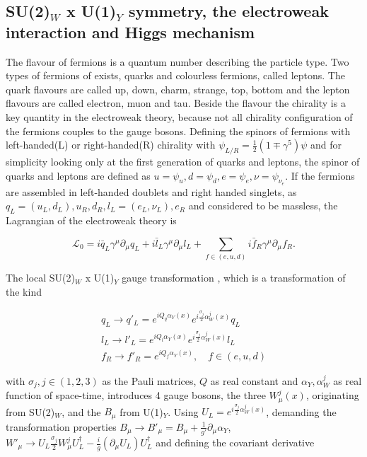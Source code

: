 \subsection{SU(2)$_{W}$ x U(1)$_{Y}$ symmetry, the electroweak interaction and Higgs mechanism}
\label{sec:section_1_1_3}

The flavour of fermions is a quantum number describing the particle type. Two types of fermions of exists, quarks and colourless fermions, called leptons. The quark flavours are called up, down, charm, strange, top, bottom and the lepton flavours are called electron, muon and tau. Beside the flavour the chirality is a key quantity in the electroweak theory, because not all chirality configuration of the fermions couples to the gauge bosons. Defining the spinors of fermions with left-handed(L) or right-handed(R) chirality with $\psi_{L/R} = \frac{1}{2}(1\mp \gamma^{5})\psi$ and for simplicity looking only at the first generation of quarks and leptons, the spinor of quarks and leptons are defined as $u = \psi_{u}, d = \psi_{d}, e = \psi_{e}, \nu = \psi_{\nu_{e}}$. If the fermions are assembled in left-handed doublets and right handed singlets, as $q_{L} = (u_{L}, d_{L}), u_{R}, d_{R}, l_{L} = (e_{L}, \nu_{L}), e_{R}$ and considered to be massless, the Lagrangian of the electroweak theory is

\begin{equation}
	\label{eq:eq_1_5}
	\mathcal{L}_{0} = i\bar{q}_{L}\gamma^{\mu}\partial_{\mu}q_{L} + i\bar{l}_{L}\gamma^{\mu}\partial_{\mu}l_{L} + \sum_{f \in (e, u, d)} i\bar{f}_{R}\gamma^{\mu}\partial_{\mu}f_{R}.
\end{equation}

The local SU(2)$_{W}$ x U(1)$_{Y}$ gauge transformation \cite{EWK}, which is a transformation of the kind

\begin{equation}
	\label{eq:eq_1_6}
	\begin{split}
		q_{L} \rightarrow q'_{L} = e^{iQ_{q} \alpha_{Y}(x)} e^{i\frac{\sigma_{j}}{2}\alpha^{j}_{W}(x)}q_{L} \\
		l_{L} \rightarrow l'_{L} = e^{iQ_{l} \alpha_{Y}(x)} e^{i\frac{\sigma_{j}}{2}\alpha^{j}_{W}(x)}l_{L} \\
		f_{R} \rightarrow f'_{R} = e^{iQ_{f} \alpha_{Y}(x)}, \quad f \in (e, u, d)
	\end{split}			
\end{equation}

with $\sigma_{j}, j \in (1,2,3)$ as the Pauli matrices, $Q$ as real constant and $\alpha_{Y}, \alpha^{j}_{W}$ as real function of space-time, introduces 4 gauge bosons, the three $W^{j}_{\mu}(x)$, originating from SU(2)$_{W}$, and the $B_{\mu}$ from U(1)$_{Y}$. Using $U_{L} = e^{i\frac{\sigma_{j}}{2}\alpha^{j}_{W}(x)}$, demanding the transformation properties $B_{\mu} \rightarrow B'_{\mu} = B_{\mu} + \frac{1}{g'}\partial_{\mu}\alpha_{Y}$, $W'_{\mu} \rightarrow U_{L}\frac{\sigma_{j}}{2}W_{\mu}^{j}U_{L}^{\dagger} - \frac{i}{g}(\partial_{\mu}U_{L})U_{L}^{\dagger}$ and defining the covariant derivative 

